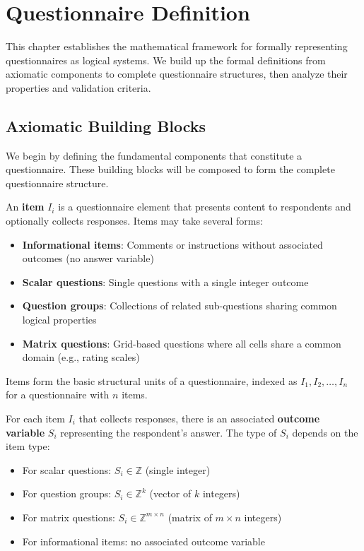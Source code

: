 \chapter{Questionnaire Definition}
\label{ch:definitions}

This chapter establishes the mathematical framework for formally representing questionnaires as logical systems. We build up the formal definitions from axiomatic components to complete questionnaire structures, then analyze their properties and validation criteria.

\section{Axiomatic Building Blocks}

We begin by defining the fundamental components that constitute a questionnaire. These building blocks will be composed to form the complete questionnaire structure.

\begin{definition}[Item]
\label{def:item}
An \textbf{item} $I_i$ is a questionnaire element that presents content to respondents and optionally collects responses. Items may take several forms:
\begin{itemize}
    \item \textbf{Informational items}: Comments or instructions without associated outcomes (no answer variable)
    \item \textbf{Scalar questions}: Single questions with a single integer outcome
    \item \textbf{Question groups}: Collections of related sub-questions sharing common logical properties
    \item \textbf{Matrix questions}: Grid-based questions where all cells share a common domain (e.g., rating scales)
\end{itemize}
\end{definition}

Items form the basic structural units of a questionnaire, indexed as $I_1, I_2, \dots, I_n$ for a questionnaire with $n$ items.

\begin{definition}
\label{def:outcome-variable}
For each item $I_i$ that collects responses, there is an associated \textbf{outcome variable} $S_i$ representing the respondent's answer. The type of $S_i$ depends on the item type:
\begin{itemize}
    \item For scalar questions: $S_i \in \mathbb{Z}$ (single integer)
    \item For question groups: $S_i \in \mathbb{Z}^k$ (vector of $k$ integers)
    \item For matrix questions: $S_i \in \mathbb{Z}^{m \times n}$ (matrix of $m \times n$ integers)
    \item For informational items: no associated outcome variable
\end{itemize}
\end{definition}

